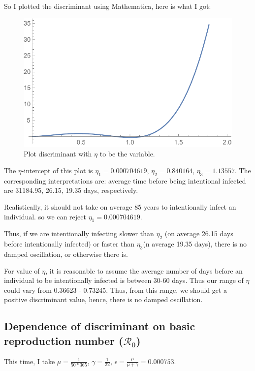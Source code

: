 \documentclass[12pt]{article}
\newcommand{\R}{\mathcal{R}}
\begin{document}
So I plotted the discriminant using Mathematica, here is what I got:

\begin{figure}[h!]
  \caption{Plot discriminant with $\eta$ to be the variable.}
  \centering
  \includegraphics[width=1\textwidth]{Figures/Discriminant_plot_S.pdf}
\end{figure}

The $\eta$-intercept of this plot is $\eta_1=0.000704619$, $\eta_2=0.840164$, $\eta_3=1.13557$. The corresponding interpretations are: average time before being intentional infected are 31184.95, 26.15, 19.35 days, respectively.

Realistically, it should not take on average 85 years to intentionally infect an individual. so we can reject $\eta_1=0.000704619$.

Thus, if we are intentionally infecting slower than $\eta_2$ (on average 26.15 days before intentionally infected) or faster than $\eta_3$(n average 19.35 days), there is no damped oscillation, or otherwise there is.

For value of $\eta$, it is reasonable to assume the average number of days before an individual to be intentionally infected is between 30-60 days. Thus our range of $\eta$ could vary from 0.36623 - 0.73245. Thus, from this range, we should get a positive discriminant value, hence, there is no damped oscillation.

\subsection{Dependence of discriminant on basic reproduction number ($\R_0$)}

This time, I take $\mu=\frac{1}{50*365}$, $\gamma=\frac{1}{22}$, $\epsilon=\frac{\mu}{\mu+\gamma}=0.000753$. 
\end{document}
